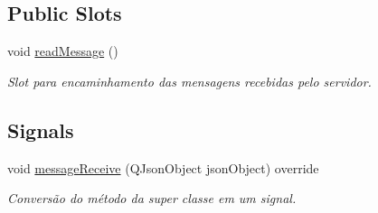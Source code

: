 \subsection*{Public Slots}
\begin{DoxyCompactItemize}
\item 
void \hyperlink{classNetworkManagerImpl_a607626213287dc476d3c7bd01c076b4e}{read\+Message} ()\hypertarget{classNetworkManagerImpl_a607626213287dc476d3c7bd01c076b4e}{}\label{classNetworkManagerImpl_a607626213287dc476d3c7bd01c076b4e}

\begin{DoxyCompactList}\small\item\em Slot para encaminhamento das mensagens recebidas pelo servidor. \end{DoxyCompactList}\end{DoxyCompactItemize}
\subsection*{Signals}
\begin{DoxyCompactItemize}
\item 
void \hyperlink{classNetworkManagerImpl_ae375fb6f5addc6325cb3a037bd9eca39}{message\+Receive} (Q\+Json\+Object json\+Object) override
\begin{DoxyCompactList}\small\item\em Conversão do método da super classe em um signal. \end{DoxyCompactList}\end{DoxyCompactItemize}
